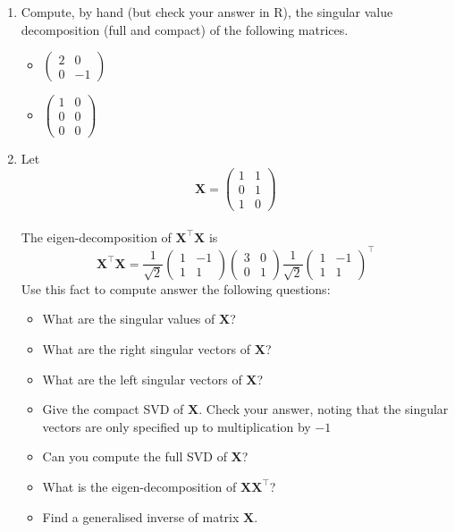 \documentclass[
]{book}
\providecommand{\tightlist}{%
  \setlength{\itemsep}{0pt}\setlength{\parskip}{0pt}}
\theoremstyle{definition}
\theoremstyle{definition}
\theoremstyle{definition}
\theoremstyle{definition}
\theoremstyle{remark}
\begin{document}
\begin{enumerate}
\def\labelenumi{\arabic{enumi}.}
\setcounter{enumi}{1}
\tightlist
\item
  Compute, by hand (but check your answer in R), the singular value decomposition (full and compact) of the following matrices.

  \begin{itemize}
  \tightlist
  \item
    \(\left(\begin{array}{cc}2&0\\0&-1\end{array}
    \right)\)
  \item
    \(\left(\begin{array}{cc}1&0\\0&0\\0&0\end{array}
    \right)\)
  \end{itemize}
\item
  Let \[\mathbf X=\left(\begin{array}{cc}1&1\\0&1\\1&0\end{array}
  \right)\]\\
  The eigen-decomposition of \(\mathbf X^\top \mathbf X\) is
  \[\mathbf X^\top \mathbf X=\frac{1}{\sqrt{2}}\left(\begin{array}{cc}1&-1\\1&1\end{array}
  \right) \left(\begin{array}{cc}3&0\\0&1\end{array}
  \right)\frac{1}{\sqrt{2}}\left(\begin{array}{cc}1&-1\\1&1\end{array}
  \right)^\top \]
  Use this fact to compute answer the following questions:

  \begin{itemize}
  \tightlist
  \item
    What are the singular values of \(\mathbf X\)?
  \item
    What are the right singular vectors of \(\mathbf X\)?
  \item
    What are the left singular vectors of \(\mathbf X\)?
  \item
    Give the compact SVD of \(\mathbf X\). Check your answer, noting that the singular vectors are only specified up to multiplication by \(-1\)
  \item
    Can you compute the full SVD of \(\mathbf X\)?
  \item
    What is the eigen-decomposition of \(\mathbf X\mathbf X^\top\)?
  \item
    Find a generalised inverse of matrix \(\mathbf X\).
  \end{itemize}
\end{enumerate}
\end{document}
